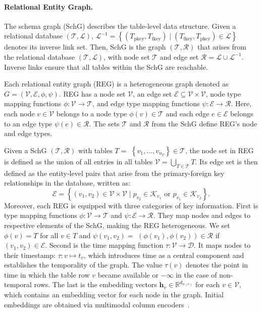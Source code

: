 \documentclass[11pt]{article}
\begin{document}
\paragraph{Relational Entity Graph.}
The schema graph (SchG) describes the table-level data structure. Given a relational database $(\mathcal{T}, \mathcal{L})$, $\mathcal{L}^{-1}=\left\{\left(T_{\text{pkey}}, T_{\text{fkey}}\right) \mid\left(T_{\text{fkey}}, T_{\text{pkey}}\right) \in \mathcal{L}\right\}$ denotes its inverse link set. Then, SchG is the graph $(\mathcal{T}, \mathcal{R})$ that arises from the relational database $(\mathcal{T}, \mathcal{L})$, with node set $\mathcal{T}$ and edge set $\mathcal{R}=\mathcal{L} \cup \mathcal{L}^{-1}$. Inverse links ensure that all tables within the SchG are reachable. %

Each relational entity graph (REG) is a heterogeneous graph denoted as $G=(\mathcal{V}, \mathcal{E}, \phi, \psi)$. REG has a node set $\mathcal{V}$, an edge set $\mathcal{E} \subseteq \mathcal{V} \times \mathcal{V}$, node type mapping functions $\phi: \mathcal{V} \rightarrow \mathcal{T}$, and edge type mapping functions $\psi: \mathcal{E} \rightarrow \mathcal{R}$. Here, each node $v \in \mathcal{V}$ belongs to a node type $\phi(v) \in \mathcal{T}$ and each edge $e \in \mathcal{E}$ belongs to an edge type $\psi(e) \in \mathcal{R}$. The sets $\mathcal{T}$ and $\mathcal{R}$ from the SchG define REG's node and edge types.

Given a SchG $(\mathcal{T}, \mathcal{R})$ with tables $T=$ $\left\{v_1, \ldots, v_{n_T}\right\} \in \mathcal{T}$, the node set in REG is defined as the union of all entries in all tables $\mathcal{V}=\bigcup_{T \in \mathcal{T}} T$. Its edge set is then defined as the entity-level pairs that arise from the primary-foreign key relationships in the database, written as:
\begin{equation}
    \mathcal{E}=\left\{\left(v_1, v_2\right) \in \mathcal{V} \times \mathcal{V} \mid p_{v_2} \in \mathcal{K}_{v_1} \text { or } p_{v_1} \in \mathcal{K}_{v_2}\right\}.    
\end{equation}
Moreover, each REG is equipped with three categories of key information. First is type mapping functions $\phi: \mathcal{V} \rightarrow \mathcal{T}$ and $\psi: \mathcal{E} \rightarrow \mathcal{R}$. They map nodes and edges to respective elements of the SchG, making the REG heterogeneous. We set $\phi(v)=T$ for all $v \in T$ and $\psi\left(v_1, v_2\right)=$ $\left(\phi\left(v_1\right), \phi\left(v_2\right)\right) \in \mathcal{R}$ if $\left(v_1, v_2\right) \in \mathcal{E}$.
Second is the time mapping function $\tau: \mathcal{V} \rightarrow \mathcal{D}$. It maps nodes to their timestamp: $\tau: v \mapsto t_v$, which introduces time as a central component and establishes the temporality of the graph. The value $\tau(v)$ denotes the point in time in which the table row $v$ became available or $-\infty$ in the case of non-temporal rows.
The last is the embedding vectors $\mathbf{h}_v \in \mathbb{R}^{d_{\phi(v)}}$ for each $v \in \mathcal{V}$, which contains an embedding vector for each node in the graph. Initial embeddings are obtained via multimodal column encoders~\citep{hu2024pytorch}. 
\end{document}
